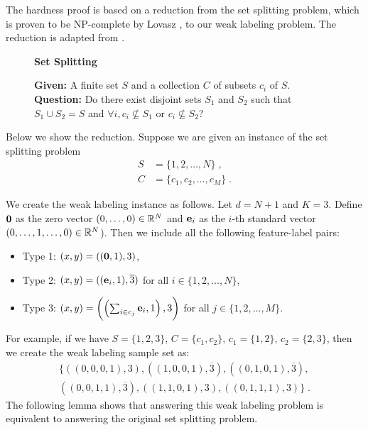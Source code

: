 The hardness proof is based on a reduction from the set splitting problem, which
is proven to be NP-complete by Lovasz \cite{Garey-Johnson-1979}, to our weak
labeling problem. The reduction is adapted from \cite{Blum-Rivest-1993}.
\begin{figure}[H]
\begin{framed}
\begin{center}
    \textbf{Set Splitting}
\end{center}
\textbf{Given:} A finite set $S$ and a collection $C$ of subsets $c_i$ of $S$. \\
\textbf{Question:} Do there exist disjoint sets $S_1$ and $S_2$ such that $S_1 \cup S_2 = S$ and $\forall i, c_i\not\subseteq S_1$ or $c_i\not\subseteq S_2$?
\end{framed}
\end{figure}

Below we show the reduction. Suppose we are given an instance of the set
splitting problem
\begin{align*}
S & = \{1, 2, \dots, N\} \; , \\
C & = \{c_1, c_2, \dots, c_M\} \; .
\end{align*}

We create the weak labeling instance as follows. Let $d=N+1$ and $K=3$.
Define $\mathbf{0}$ as the zero vector $(0,\dots,0)\in \mathbb{R}^N$ and $\mathbf{e}_i$ as the
$i$-th standard vector $(0,\dots, 1, \dots, 0)\in \mathbb{R}^N$). Then we include all
the following feature-label pairs:
\begin{itemize}
\item Type 1: $(x,y)=((\mathbf{0},1), 3)$,
\item Type 2: $(x,y)=((\mathbf{e}_i,1), \overline{3})$ for all $i \in \{1,2,\dots,N\}$,
\item Type 3: $(x,y)=\left(\left(\sum_{i\in c_j} \mathbf{e}_i, 1\right), 3\right)$ for all $j \in \{1,2,\dots,M\}$.
\end{itemize}

For example, if we have $S=\{1,2,3\}$, $C=\{c_1, c_2\}$, $c_1 = \{1,2\}$,
$c_2=\{2,3\}$, then we create the weak labeling sample set as:
\begin{multline*}
\{
((0,0,0,1),3), ((1,0,0,1),\overline{3}), ((0,1,0,1),\overline{3}), \\
((0,0,1,1),\overline{3}), ((1,1,0,1),3), ((0,1,1,1),3)
\} \; .
\end{multline*}
The following lemma shows that answering this weak labeling problem is
equivalent to answering the original set splitting problem.

